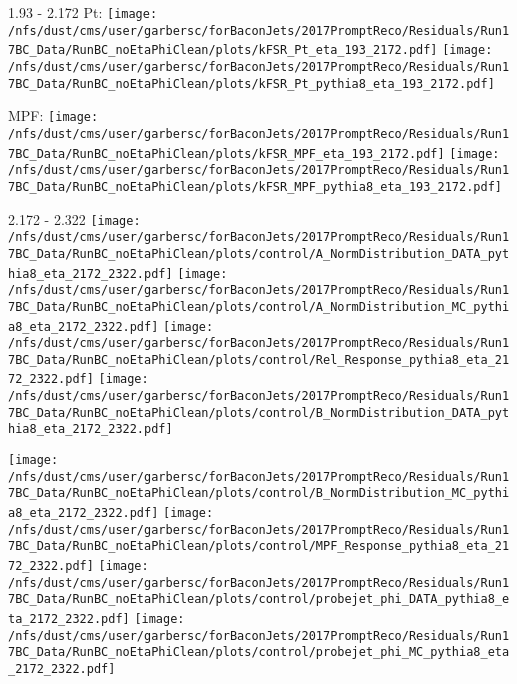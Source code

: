 \documentclass[t,compress]{beamer}
\begin{document}
\begin{frame}{1.93 - 2.172}
	 Pt: \texttt{[image: /nfs/dust/cms/user/garbersc/forBaconJets/2017PromptReco/Residuals/Run17BC\_Data/RunBC\_noEtaPhiClean/plots/kFSR\_Pt\_eta\_193\_2172.pdf]}
	\texttt{[image: /nfs/dust/cms/user/garbersc/forBaconJets/2017PromptReco/Residuals/Run17BC\_Data/RunBC\_noEtaPhiClean/plots/kFSR\_Pt\_pythia8\_eta\_193\_2172.pdf]}
\newline

	 MPF: \texttt{[image: /nfs/dust/cms/user/garbersc/forBaconJets/2017PromptReco/Residuals/Run17BC\_Data/RunBC\_noEtaPhiClean/plots/kFSR\_MPF\_eta\_193\_2172.pdf]}
	\texttt{[image: /nfs/dust/cms/user/garbersc/forBaconJets/2017PromptReco/Residuals/Run17BC\_Data/RunBC\_noEtaPhiClean/plots/kFSR\_MPF\_pythia8\_eta\_193\_2172.pdf]}
\end{frame}

\begin{frame}{2.172 - 2.322}
	\texttt{[image: /nfs/dust/cms/user/garbersc/forBaconJets/2017PromptReco/Residuals/Run17BC\_Data/RunBC\_noEtaPhiClean/plots/control/A\_NormDistribution\_DATA\_pythia8\_eta\_2172\_2322.pdf]}
	\texttt{[image: /nfs/dust/cms/user/garbersc/forBaconJets/2017PromptReco/Residuals/Run17BC\_Data/RunBC\_noEtaPhiClean/plots/control/A\_NormDistribution\_MC\_pythia8\_eta\_2172\_2322.pdf]}
	\texttt{[image: /nfs/dust/cms/user/garbersc/forBaconJets/2017PromptReco/Residuals/Run17BC\_Data/RunBC\_noEtaPhiClean/plots/control/Rel\_Response\_pythia8\_eta\_2172\_2322.pdf]}
	\texttt{[image: /nfs/dust/cms/user/garbersc/forBaconJets/2017PromptReco/Residuals/Run17BC\_Data/RunBC\_noEtaPhiClean/plots/control/B\_NormDistribution\_DATA\_pythia8\_eta\_2172\_2322.pdf]}
\newline

	\texttt{[image: /nfs/dust/cms/user/garbersc/forBaconJets/2017PromptReco/Residuals/Run17BC\_Data/RunBC\_noEtaPhiClean/plots/control/B\_NormDistribution\_MC\_pythia8\_eta\_2172\_2322.pdf]}
	\texttt{[image: /nfs/dust/cms/user/garbersc/forBaconJets/2017PromptReco/Residuals/Run17BC\_Data/RunBC\_noEtaPhiClean/plots/control/MPF\_Response\_pythia8\_eta\_2172\_2322.pdf]}
	\texttt{[image: /nfs/dust/cms/user/garbersc/forBaconJets/2017PromptReco/Residuals/Run17BC\_Data/RunBC\_noEtaPhiClean/plots/control/probejet\_phi\_DATA\_pythia8\_eta\_2172\_2322.pdf]}
	\texttt{[image: /nfs/dust/cms/user/garbersc/forBaconJets/2017PromptReco/Residuals/Run17BC\_Data/RunBC\_noEtaPhiClean/plots/control/probejet\_phi\_MC\_pythia8\_eta\_2172\_2322.pdf]}
\end{frame}
\end{document}
